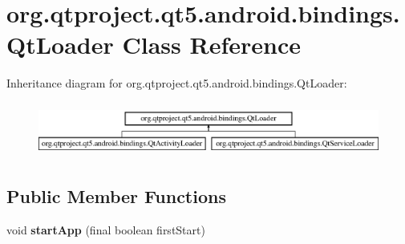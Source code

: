\hypertarget{classorg_1_1qtproject_1_1qt5_1_1android_1_1bindings_1_1_qt_loader}{}\section{org.\+qtproject.\+qt5.\+android.\+bindings.\+Qt\+Loader Class Reference}
\label{classorg_1_1qtproject_1_1qt5_1_1android_1_1bindings_1_1_qt_loader}
Inheritance diagram for org.\+qtproject.\+qt5.\+android.\+bindings.\+Qt\+Loader\+:\begin{figure}[H]
\begin{center}
\leavevmode
\includegraphics[height=1.806452cm]{classorg_1_1qtproject_1_1qt5_1_1android_1_1bindings_1_1_qt_loader}
\end{center}
\end{figure}
\subsection*{Public Member Functions}
\begin{DoxyCompactItemize}
\item 
\mbox{\label{classorg_1_1qtproject_1_1qt5_1_1android_1_1bindings_1_1_qt_loader_a87dff5a9758807202874fff57e64f6d7}} 
void {\bfseries start\+App} (final boolean first\+Start)
\end{DoxyCompactItemize}
